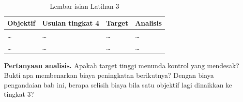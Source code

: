 \begin{table}[!htb]
  \centering\small
  \caption{Lembar isian Latihan 3}\label{tab:ch08-lat3-hasil}
  \begin{tabularx}{\textwidth}{|>{\raggedright\arraybackslash}p{}|>{\raggedright\arraybackslash}X|>{\raggedright\arraybackslash}p{}|>{\raggedright\arraybackslash}X|}
    \hline
    \textbf{Objektif} & \textbf{Usulan tingkat 4} & \textbf{Target} & \textbf{Analisis} \\ \hline
    \dots & \dots & \dots & \dots \\ \hline
    \dots & \dots & \dots & \dots \\ \hline
  \end{tabularx}
\end{table}

\textbf{Pertanyaan analisis.} Apakah target tinggi menunda kontrol yang mendesak? Bukti apa
membenarkan biaya peningkatan berikutnya? Dengan biaya pengandaian bab ini, berapa selisih biaya
bila satu objektif lagi dinaikkan ke tingkat 3?
